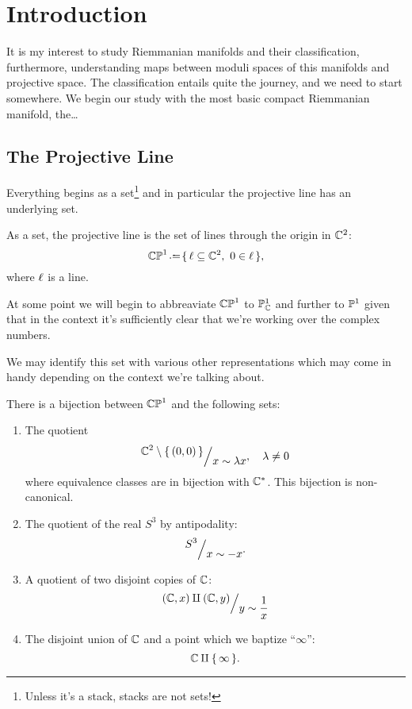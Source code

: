 \documentclass[12pt]{memoir}
\author{\nauthor}
\begin{document}
\chapter{Introduction}

It is my interest to study Riemmanian manifolds and their classification, furthermore, understanding maps between moduli spaces of this manifolds and projective space. The classification entails quite the journey, and we need to start somewhere. We begin our study with the most basic compact Riemmanian manifold, the\dots

\section{The Projective Line}

Everything begins as a set\footnote{Unless it's a stack, stacks are not sets!} and in particular the projective line has an underlying set.

\begin{Def}
    As a set, the projective line is the set of lines through the origin in $\mathbb{C}^2$:
    $$\bCP^1\defeq \set{\l\subseteq \bC^2,\ 0\in \l},$$
    where $\ell$ is a line. 
\end{Def}

\begin{Rmk}
    At some point we will begin to abbreaviate $\mathbb{CP}^1$ to $\mathbb{P}^1_{\mathbb{C}}$ and further to $\mathbb{P}^1$ given that in the context it's sufficiently clear that we're working over the complex numbers.
\end{Rmk}

We may identify this set with various other representations which may come in handy depending on the context we're talking about.

\begin{Th}\label{thm-projective-line-as-set}
    There is a bijection between $\mathbb{CP}^1$ and the following sets:
    \begin{enumerate}
        \item The quotient 
        $$\quot{\bC^2\less\set{(0,0)}}{x\sim\la x},\quad\la\neq 0$$
        where equivalence classes are in bijection with $\mathbb{C}^\ast$. This bijection is non-canonical.
        \item The quotient of the real $S^3$ by antipodality:
        $$\quot{S^3}{x\sim-x}.$$
        \item A quotient of two disjoint copies of $\mathbb{C}$:
        $$\quot{(\bC,x)\amalg(\bC,y)}{y\sim\frac{1}{x}}$$
        \item The disjoint union of $\mathbb{C}$ and a point which we baptize ``$\infty$'':
        $$\mathbb{C}\amalg\{\,\infty\,\}.$$
    \end{enumerate}
\end{Th}
\end{document}
